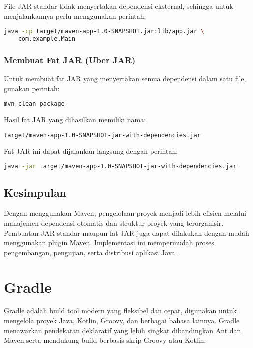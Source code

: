 File JAR standar tidak menyertakan dependensi eksternal, sehingga untuk menjalankannya perlu menggunakan perintah:
\begin{lstlisting}[language=bash]
	java -cp target/maven-app-1.0-SNAPSHOT.jar:lib/app.jar \
	com.example.Main
\end{lstlisting}

\subsubsection{Membuat Fat JAR (Uber JAR)}

Untuk membuat fat JAR yang menyertakan semua dependensi dalam satu file, gunakan perintah:

\begin{lstlisting}[language=bash]
	mvn clean package
\end{lstlisting}

Hasil fat JAR yang dihasilkan memiliki nama:
\begin{lstlisting}[language=bash]
	target/maven-app-1.0-SNAPSHOT-jar-with-dependencies.jar
\end{lstlisting}

Fat JAR ini dapat dijalankan langsung dengan perintah:
\begin{lstlisting}[language=bash]
	java -jar target/maven-app-1.0-SNAPSHOT-jar-with-dependencies.jar
\end{lstlisting}

\subsection{Kesimpulan}

Dengan menggunakan Maven, pengelolaan proyek menjadi lebih efisien melalui manajemen dependensi otomatis dan struktur proyek yang terorganisir. Pembuatan JAR standar maupun fat JAR juga dapat dilakukan dengan mudah menggunakan plugin Maven. Implementasi ini mempermudah proses pengembangan, pengujian, serta distribusi aplikasi Java.



\section{Gradle}
Gradle adalah build tool modern yang fleksibel dan cepat, digunakan untuk mengelola proyek Java, Kotlin, Groovy, dan berbagai bahasa lainnya. Gradle menawarkan pendekatan deklaratif yang lebih singkat dibandingkan Ant dan Maven serta mendukung build berbasis skrip Groovy atau Kotlin.

